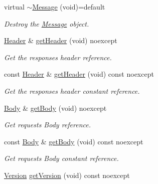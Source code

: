 \begin{DoxyCompactItemize}
\item 
virtual \mbox{\hyperlink{classo_z_1_1_h_t_t_p_1_1_message_a42e40b68d8080d66ca335a2b8fc45c79}{$\sim$\+Message}} (void)=default
\begin{DoxyCompactList}\small\item\em Destroy the \mbox{\hyperlink{classo_z_1_1_h_t_t_p_1_1_message}{Message}} object. \end{DoxyCompactList}\item 
\mbox{\hyperlink{classo_z_1_1_h_t_t_p_1_1_header}{Header}} \& \mbox{\hyperlink{classo_z_1_1_h_t_t_p_1_1_message_a17e948e575922d18e084d9ad8c6f4538}{get\+Header}} (void) noexcept
\begin{DoxyCompactList}\small\item\em Get the response\textquotesingle{}s header reference. \end{DoxyCompactList}\item 
const \mbox{\hyperlink{classo_z_1_1_h_t_t_p_1_1_header}{Header}} \& \mbox{\hyperlink{classo_z_1_1_h_t_t_p_1_1_message_a01624052798c5304cb8c6f3de637ac96}{get\+Header}} (void) const noexcept
\begin{DoxyCompactList}\small\item\em Get the response\textquotesingle{}s header constant reference. \end{DoxyCompactList}\item 
\mbox{\hyperlink{namespaceo_z_1_1_h_t_t_p_a270c38b9f9b6228ce430fda6d5b150d6}{Body}} \& \mbox{\hyperlink{classo_z_1_1_h_t_t_p_1_1_message_aed4d82d784cf503dbbfa1180f9b3434f}{get\+Body}} (void) noexcept
\begin{DoxyCompactList}\small\item\em Get request\textquotesingle{}s Body reference. \end{DoxyCompactList}\item 
const \mbox{\hyperlink{namespaceo_z_1_1_h_t_t_p_a270c38b9f9b6228ce430fda6d5b150d6}{Body}} \& \mbox{\hyperlink{classo_z_1_1_h_t_t_p_1_1_message_ad06f3f586945dad61b206607f340f4e1}{get\+Body}} (void) const noexcept
\begin{DoxyCompactList}\small\item\em Get request\textquotesingle{}s Body constant reference. \end{DoxyCompactList}\item 
\mbox{\hyperlink{structo_z_1_1_h_t_t_p_1_1_version}{Version}} \mbox{\hyperlink{classo_z_1_1_h_t_t_p_1_1_message_a6041a3ba343c0115c79c233e5c322d0b}{get\+Version}} (void) const noexcept

\end{DoxyCompactItemize}

